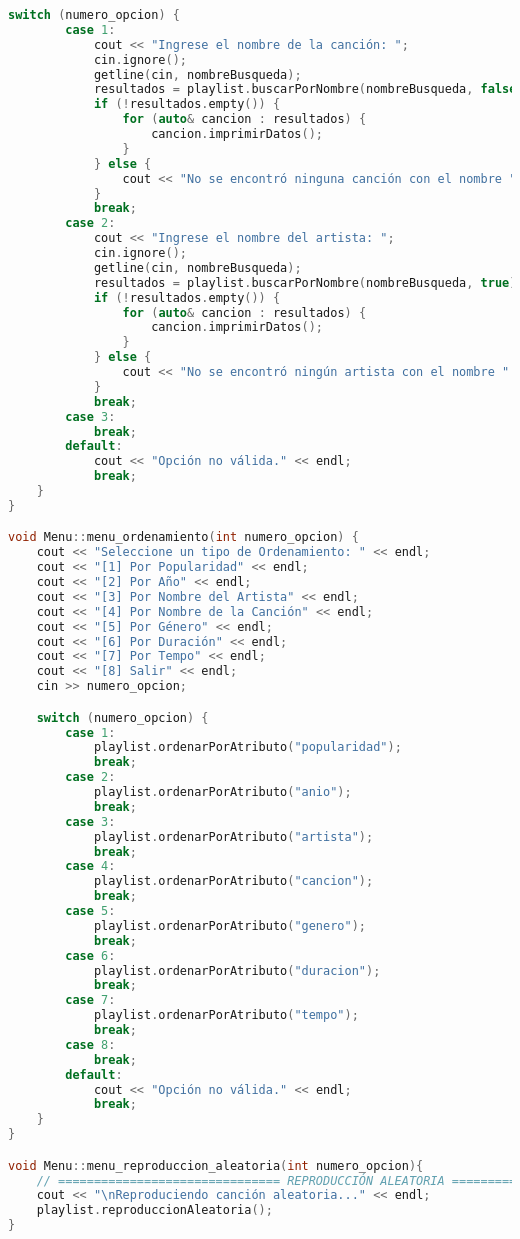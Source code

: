 \documentclass[12pt]{article}
\begin{document}
\begin{flushleft}
\begin{lstlisting}[language=C++, style=mystyle, caption={Cabecera de la Clase Menú}]
    switch (numero_opcion) {
        case 1:
            cout << "Ingrese el nombre de la canción: ";
            cin.ignore();
            getline(cin, nombreBusqueda);
            resultados = playlist.buscarPorNombre(nombreBusqueda, false);
            if (!resultados.empty()) {
                for (auto& cancion : resultados) {
                    cancion.imprimirDatos();
                }
            } else {
                cout << "No se encontró ninguna canción con el nombre " << nombreBusqueda << ".\n";
            }
            break;
        case 2:
            cout << "Ingrese el nombre del artista: ";
            cin.ignore();
            getline(cin, nombreBusqueda);
            resultados = playlist.buscarPorNombre(nombreBusqueda, true);
            if (!resultados.empty()) {
                for (auto& cancion : resultados) {
                    cancion.imprimirDatos();
                }
            } else {
                cout << "No se encontró ningún artista con el nombre " << nombreBusqueda << ".\n";
            }
            break;
        case 3:
            break;
        default:
            cout << "Opción no válida." << endl;
            break;
    }
}

void Menu::menu_ordenamiento(int numero_opcion) {
    cout << "Seleccione un tipo de Ordenamiento: " << endl;
    cout << "[1] Por Popularidad" << endl;
    cout << "[2] Por Año" << endl;
    cout << "[3] Por Nombre del Artista" << endl;
    cout << "[4] Por Nombre de la Canción" << endl;
    cout << "[5] Por Género" << endl;
    cout << "[6] Por Duración" << endl;
    cout << "[7] Por Tempo" << endl;
    cout << "[8] Salir" << endl;
    cin >> numero_opcion;

    switch (numero_opcion) {
        case 1:
            playlist.ordenarPorAtributo("popularidad");
            break;
        case 2:
            playlist.ordenarPorAtributo("anio");
            break;
        case 3:
            playlist.ordenarPorAtributo("artista");
            break;
        case 4:
            playlist.ordenarPorAtributo("cancion");
            break;
        case 5:
            playlist.ordenarPorAtributo("genero");
            break;
        case 6:
            playlist.ordenarPorAtributo("duracion");
            break;
        case 7:
            playlist.ordenarPorAtributo("tempo");
            break;
        case 8:
            break;
        default:
            cout << "Opción no válida." << endl;
            break;
    }
}

void Menu::menu_reproduccion_aleatoria(int numero_opcion){
    // =============================== REPRODUCCIÓN ALEATORIA ===============================
    cout << "\nReproduciendo canción aleatoria..." << endl;
    playlist.reproduccionAleatoria();
} 


\end{lstlisting}
\end{flushleft}
\end{document}
